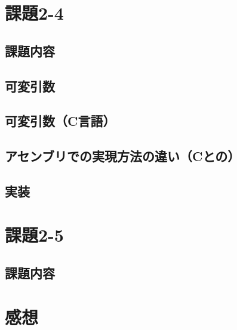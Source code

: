 \documentclass[a4j,11pt]{jarticle}
\begin{document}
\section{課題2-4}
\subsection{課題内容}

\subsection{可変引数}


\subsection{可変引数（C言語）}

\subsection{アセンブリでの実現方法の違い（Cとの）}

\subsection{実装}

\section{課題2-5}

\subsection{課題内容}

\section{感想}
\end{document}
